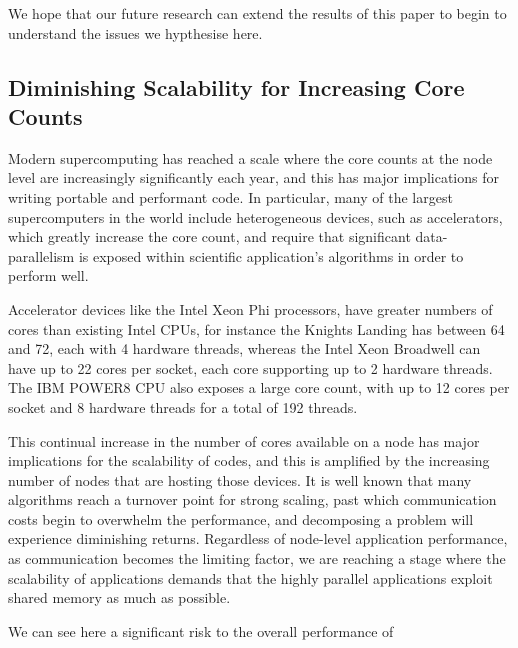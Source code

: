 \documentclass[runningheads,a4paper]{llncs}
\begin{document}
We hope that our future research can extend the results of this paper to begin to understand the issues we hypthesise here.

\subsection{Diminishing Scalability for Increasing Core Counts}

\label{sec:scalability-inhibit}

Modern supercomputing has reached a scale where the core counts at the node level are increasingly significantly each year, and this has major implications for writing portable and performant code. In particular, many of the largest supercomputers in the world include heterogeneous devices, such as accelerators, which greatly increase the core count, and require that significant data-parallelism is exposed within scientific application's algorithms in order to perform well.

Accelerator devices like the Intel Xeon Phi processors, have greater numbers of cores than existing Intel CPUs, for instance the Knights Landing has between 64 and 72, each with 4 hardware threads, whereas the Intel Xeon Broadwell can have up to 22 cores per socket, each core supporting up to 2 hardware threads. The IBM POWER8 CPU also exposes a large core count, with up to 12 cores per socket and 8 hardware threads for a total of 192 threads.

This continual increase in the number of cores available on a node has major implications for the scalability of codes, and this is amplified by the increasing number of nodes that are hosting those devices. It is well known that many algorithms reach a turnover point for strong scaling, past which communication costs begin to overwhelm the performance, and decomposing a problem will experience diminishing returns. Regardless of node-level application performance, as communication becomes the limiting factor, we are reaching a stage where the scalability of applications demands that the highly parallel applications exploit shared memory as much as possible.

We can see here a significant risk to the overall performance of 


\end{document}
